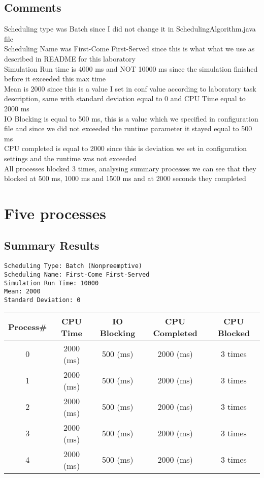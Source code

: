 \documentclass{report}
\begin{document}
\subsection{Comments}
Scheduling type was Batch since I did not change it in SchedulingAlgorithm.java
file \\
Scheduling Name was First-Come First-Served since this is what what we use as
described in README for this laboratory \\
Simulation Run time is 4000 ms and NOT 10000 ms since the simulation finished
before it exceeded this max time \\
Mean is 2000 since this is a value I set in conf value according to laboratory
task description, same with standard deviation equal to 0 and CPU Time equal to
2000 ms \\
IO Blocking is equal to 500 ms, this is a value which we specified in
configuration file and since we did not exceeded the runtime parameter it stayed
equal to 500 ms \\
CPU completed is equal to 2000 since this is deviation we set in configuration
settings and the runtime was not exceeded \\
All processes blocked 3 times, analysing summary processes we can see that they
blocked at 500 ms, 1000 ms and 1500 ms and at 2000 seconds they completed 
 
\section{Five processes}
\newpage
\subsection{Summary Results}
\begin{lstlisting}
Scheduling Type: Batch (Nonpreemptive)
Scheduling Name: First-Come First-Served
Simulation Run Time: 10000
Mean: 2000
Standard Deviation: 0
\end{lstlisting}
\begin{center}                        
\begin{tabular}{| c | c | c | c | c |}                                      
\hline                                                                      
Process\# &     CPU Time &      IO Blocking & CPU Completed & CPU Blocked \\
\hline
0&		2000 (ms)&	500 (ms)&	2000 (ms)&	3 times \\
\hline
1&		2000 (ms)&	500 (ms)&	2000 (ms)&	3 times \\
\hline
2&		2000 (ms)&	500 (ms)&	2000 (ms)&	3 times \\
\hline
3&		2000 (ms)&	500 (ms)&	2000 (ms)&	3 times \\
\hline
4&		2000 (ms)&	500 (ms)&	2000 (ms)&	3 times \\
\hline
\end{tabular}
\end{center}
           
\end{document}
